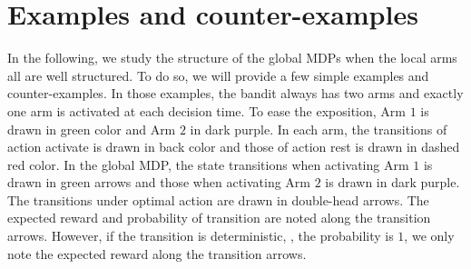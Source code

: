 %
%

\section{Examples and counter-examples}
\label{ch:restless:sec:example}

In the following, we study the structure of the global MDPs when the local arms all are well structured.
To do so, we will provide a few simple examples and counter-examples.
In those examples, the bandit always has two arms and exactly one arm is activated at each decision time.
To ease the exposition, Arm $1$ is drawn in green color and Arm $2$ in dark purple.
In each arm, the transitions of action activate is drawn in back color and those of action rest is drawn in dashed red color.
In the global MDP, the state transitions when activating Arm $1$ is drawn in green arrows and those when activating Arm $2$ is drawn in dark purple.
The transitions under optimal action are drawn in double-head arrows.
The expected reward and probability of transition are noted along the transition arrows.
However, if the transition is deterministic, \ie, the probability is $1$, we only note the expected reward along the transition arrows.


